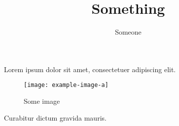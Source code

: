 \documentclass[a5paper,12pt,onecolumn]{article}
\title{Something}
\author{Someone}
\begin{document}
\begin{multicols}{2}
Lorem ipsum dolor sit amet, consectetuer adipiscing elit.
\begin{figure}[H]
  \texttt{[image: example-image-a]}
  \caption{Some image}
\end{figure}
Curabitur dictum gravida mauris.

\blindtext
\end{multicols}
\end{document}
